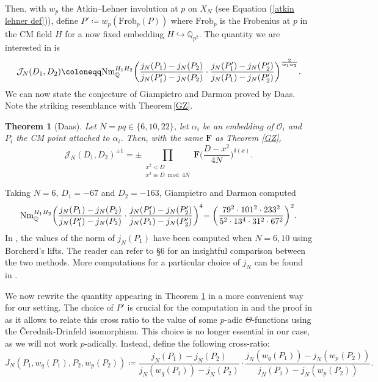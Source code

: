 \documentclass[a4paper,12pt]{article}
\newtheorem{theorem}{Theorem}
\newcommand{\QQ}{\mathbb{Q}}
\begin{document}
Then, with $w_p$ the Atkin--Lehner involution at $p$ on $X_N$ (see Equation (\ref{atkin lehner def})),  define $P'\coloneqq w_p(\text{Frob}_p(P))$ where $\text{Frob}_p$ is the Frobenius at $p$ in the CM field $H$ for a now fixed embedding $H\hookrightarrow \QQ_{p^2}$. The quantity we are interested in is 
\begin{equation}
\mathcal{J}_N(D_1,D_2)\coloneqq \textup{Nm}_\mathbb{Q}^{H_1H_2}\biggl(\frac{j_N(P_1)-j_N(P_2)}{j_N(P_1')-j_N(P_2)}\cdot
\frac{j_N(P_1')-j_N(P_2')}{j_N(P_1)-j_N(P_2')}\biggl)^{\frac{ 2}{w_1w_2}}.
\end{equation} 
We can now state the conjecture of Giampietro and Darmon proved by Daas. Note the striking resemblance with Theorem$\,$\ref{GZ}. 
\begin{theorem}[Daas]\label{padicgz}
    Let $N=pq\in\{6,10,22\}$, let $\alpha_i$ be an embedding of $\mathcal{O}_i$ and $P_i$ the CM point attached to $\alpha_i$. Then, with the same $\mathbf{F}$ as Theorem \ref{GZ},
    \begin{equation}
\mathcal{J}_N(D_1,D_2)^{\pm1}=\pm\prod_{\substack{x^2<D\\x^2\equiv D \bmod{4N}}
    }\mathbf{F}\biggl(\frac{D-x^2}{4N}\biggl)^{\delta(x)}. \end{equation}
\end{theorem}
Taking $N=6$, $D_1=-67$ and $D_2=-163$, Giampietro and Darmon computed
\begin{equation}
\textup{Nm}_\mathbb{Q}^{H_1H_2}\biggl(\frac{j_N(P_1)-j_N(P_2)}{j_N(P_1')-j_N(P_2)}\cdot
\frac{j_N(P_1')-j_N(P_2')}{j_N(P_1)-j_N(P_2')}\biggl)^4=\biggl(\frac{79^2\cdot101^2\cdot233^2}{5^2\cdot13^4\cdot31^2\cdot67^2}\biggl)^2.
\end{equation}
In \cite{Errthum_2011}, the values of the norm of $j_N(P_1)$ have been computed when $N=6,10$ using Borcherd's lifts. The reader can refer to \cite{GiampetroDarmon} \S 6 for an insightful comparison between the two methods. More computations for a particular choice of $j_N$  can be found in \cite{Voight2009}. 
\par
We now rewrite the quantity appearing in Theorem \ref{padicgz} in a more convenient way for our setting.
The choice of $P'$ is crucial for the computation in \cite{GiampetroDarmon} and the proof in \cite{Daas} as it allows to relate this cross ratio to the value of some $p$-adic $\Theta$-functions using the Čerednik-Drinfeld isomorphism. This choice is no longer essential in our case, as we will not work $p$-adically. Instead, define the following cross-ratio:
\begin{equation}\label{def J_n}
J_N(P_1,w_q(P_1),P_2,w_p(P_2))\coloneqq
\frac{j_N(P_1)-j_N(P_2)}{j_N(w_q(P_1))-j_N(P_2)}\cdot
\frac{j_N(w_q(P_1))-j_N(w_p(P_2))}{j_N(P_1)-j_N(w_p(P_2))}.
\end{equation}
\end{document}
